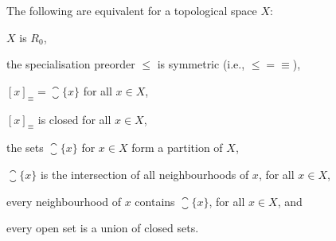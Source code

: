 \documentclass[article, a4paper, 11pt, oneside]{memoir}
\numberwithin{equation}{chapter}
\begin{document}
\begin{proposition}
    \label{prop:R0-equivalent-properties}
    The following are equivalent for a topological space $X$:
    \begin{enumprop}
        \item \label{enum:R0-space} $X$ is $R_0$,
        \item \label{enum:R0-specialisation-preorder-symmetric} the specialisation preorder $\leq$ is symmetric (i.e., ${\leq} = {\equiv}$),
        \item \label{enum:R0-closure-of-point} $[x]_\equiv = \closure{\{x\}}$ for all $x \in X$,
        \item \label{enum:R0-equivalence-class-closed} $[x]_\equiv$ is closed for all $x \in X$,
        \item \label{enum:R0-partition} the sets $\closure{\{x\}}$ for $x \in X$ form a partition of $X$,
        \item \label{enum:R0-closure-intersection-of-nhoods} $\closure{\{x\}}$ is the intersection of all neighbourhoods of $x$, for all $x \in X$,
        \item \label{enum:R0-nhood-contains-closure} every neighbourhood of $x$ contains $\closure{\{x\}}$, for all $x \in X$, and
        \item \label{enum:R0-open-union-of-closed} every open set is a union of closed sets.
    \end{enumprop}
\end{proposition}
\end{document}
